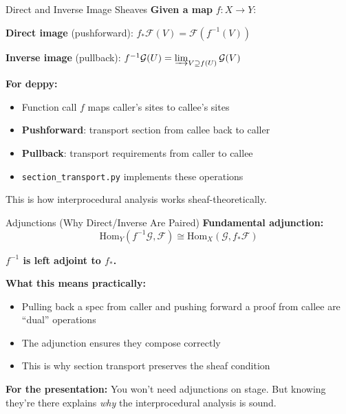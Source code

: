 \documentclass[aspectratio=169,10pt]{beamer}
\newcommand{\Fscr}{\mathcal{F}}
\newcommand{\Gscr}{\mathcal{G}}
\newcommand{\Hom}{\mathrm{Hom}}
\begin{document}
\begin{frame}{Direct and Inverse Image Sheaves}
\textbf{Given a map} $f : X \to Y$:

\textbf{Direct image} (pushforward): $f_* \Fscr(V) = \Fscr(f^{-1}(V))$

\textbf{Inverse image} (pullback): $f^{-1}\Gscr(U) = \varinjlim_{V \supseteq f(U)} \Gscr(V)$

\vspace{0.5em}
\textbf{For deppy:}
\begin{itemize}
  \item Function call $f$ maps caller's sites to callee's sites
  \item \textbf{Pushforward}: transport section from callee back to caller
  \item \textbf{Pullback}: transport requirements from caller to callee
  \item \texttt{section\_transport.py} implements these operations
\end{itemize}

This is how interprocedural analysis works sheaf-theoretically.
\end{frame}

\begin{frame}{Adjunctions (Why Direct/Inverse Are Paired)}
\textbf{Fundamental adjunction:}
\[
\Hom_Y(f^{-1}\Gscr, \Fscr) \cong \Hom_X(\Gscr, f_*\Fscr)
\]

\textbf{$f^{-1}$ is left adjoint to $f_*$.}

\vspace{0.5em}
\textbf{What this means practically:}
\begin{itemize}
  \item Pulling back a spec from caller and pushing forward a proof from callee are ``dual'' operations
  \item The adjunction ensures they compose correctly
  \item This is why section transport preserves the sheaf condition
\end{itemize}

\vspace{0.3em}
\textbf{For the presentation:} You won't need adjunctions on stage. But knowing they're there explains \emph{why} the interprocedural analysis is sound.
\end{frame}
\end{document}
